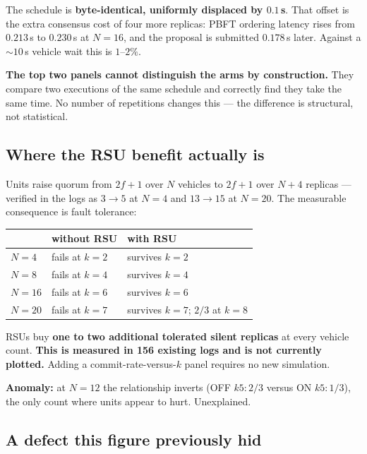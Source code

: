 \documentclass[11pt,a4paper]{article}
\newcommand{\caveat}[1]{\textcolor{red!60!black}{\textbf{#1}}}
\begin{document}
\noindent
The schedule is \textbf{byte-identical, uniformly displaced by $0.1$\,s}. That
offset is the extra consensus cost of four more replicas: PBFT ordering latency
rises from $0.213$\,s to $0.230$\,s at $N{=}16$, and the proposal is submitted
$0.178$\,s later. Against a ${\sim}10$\,s vehicle wait this is $1$--$2\%$.

\caveat{The top two panels cannot distinguish the arms by construction.} They
compare two executions of the same schedule and correctly find they take the
same time. No number of repetitions changes this --- the difference is
structural, not statistical.

\subsection*{Where the RSU benefit actually is}

Units raise quorum from $2f{+}1$ over $N$ vehicles to $2f{+}1$ over $N{+}4$
replicas --- verified in the logs as $3\to5$ at $N{=}4$ and $13\to15$ at
$N{=}20$. The measurable consequence is fault tolerance:

\begin{center}
\begin{tabular}{lll}
\toprule
& without RSU & with RSU \\
\midrule
$N{=}4$  & fails at $k{=}2$ & survives $k{=}2$ \\
$N{=}8$  & fails at $k{=}4$ & survives $k{=}4$ \\
$N{=}16$ & fails at $k{=}6$ & survives $k{=}6$ \\
$N{=}20$ & fails at $k{=}7$ & survives $k{=}7$; $2/3$ at $k{=}8$ \\
\bottomrule
\end{tabular}
\end{center}

\noindent
RSUs buy \textbf{one to two additional tolerated silent replicas} at every
vehicle count. \caveat{This is measured in 156 existing logs and is not
currently plotted.} Adding a commit-rate-versus-$k$ panel requires no new
simulation.

\caveat{Anomaly:} at $N{=}12$ the relationship inverts (OFF $k5{:}2/3$ versus ON
$k5{:}1/3$), the only count where units appear to hurt. Unexplained.

\subsection*{A defect this figure previously hid}
\end{document}
